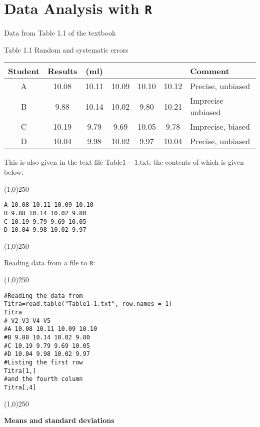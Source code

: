 \section{Data Analysis with \texttt{R}}

Data from Table 1.1 of the textbook

Table 1.1 Random and systematic errors

\begin{tabular}{|c|ccccc|l|}
	\hline
	Student & Results  & (ml) &  &  &  &Comment \\ \hline
	A & 10.08 & 10.11 &10.09 &10.10&10.12 & Precise, unbiased\\ \hline
	B & 9.88 &10.14& 10.02 &9.80& 10.21& Imprecise unbiased\\ \hline
	C & 10.19 &9.79& 9.69 &10.05& 9.78 & Imprecise, biased\\ \hline
	D & 10.04 &9.98 &10.02 &9.97 &10.04 & Precise, unbiased \\
	\hline
\end{tabular}
\bigskip

This is also given in the text file Table$1-1$.txt, the contents of which is given below:
\begin{center}
	\line(1,0){250}
\end{center}
\begin{verbatim}
A 10.08 10.11 10.09 10.10
B 9.88 10.14 10.02 9.80
C 10.19 9.79 9.69 10.05
D 10.04 9.98 10.02 9.97
\end{verbatim}
\begin{center}
	\line(1,0){250}
\end{center}

Reading data from a file to \texttt{R}:
\begin{center}
	\line(1,0){250}
\end{center}
\begin{verbatim}
#Reading the data from
Titra=read.table("Table1-1.txt", row.names = 1)
Titra
# V2 V3 V4 V5
#A 10.08 10.11 10.09 10.10
#B 9.88 10.14 10.02 9.80
#C 10.19 9.79 9.69 10.05
#D 10.04 9.98 10.02 9.97
#Listing the first row
Titra[1,]
#and the fourth column
Titra[,4]
\end{verbatim}
\begin{center}
	\line(1,0){250}
\end{center}

\textbf{Means and standard deviations}\\

